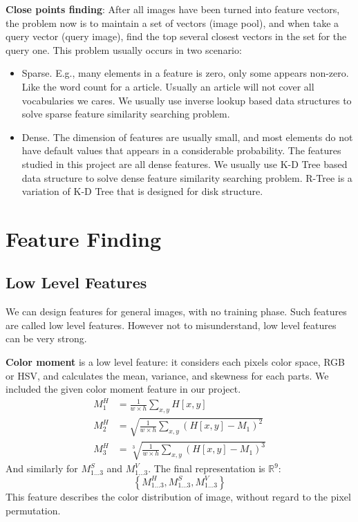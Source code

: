 \documentclass{acm_proc_article-sp}
\begin{document}
\textbf{Close points finding}: After all images have been turned into feature
vectors, the problem now is to maintain a set of vectors (image pool), and when
take a query vector (query image), find the top several closest vectors in the
set for the query one. This problem usually occurs in two scenario:
\begin{itemize}
        \item Sparse. E.g., many elements in a feature is zero, only some
                appears non-zero. Like the word count for a article. Usually an
                article will not cover all vocabularies we cares. We usually
                use inverse lookup based data structures to solve sparse
                feature similarity searching problem.
        \item Dense. The dimension of features are usually small, and most
                elements do not have default values that appears in a
                considerable probability. The features studied in this project
                are all dense features. We usually use K-D Tree based data
                structure to solve dense feature similarity searching problem.
                R-Tree is a variation of K-D Tree that is designed for disk
                structure.
\end{itemize}

\section{Feature Finding}
\subsection{Low Level Features}

We can design features for general images, with no training phase. Such
features are called low level features. However not to misunderstand, low level
features can be very strong.

\textbf{Color moment} is a low level feature: it considers each pixels color
space, RGB or HSV, and calculates the mean, variance, and skewness for each parts.
We included the given color moment feature in our project.
\begin{align}
        M^H_1&=\frac{1}{w\times h}\sum_{x,y}H[x,y]\\
        M^H_2&=\sqrt{\frac{1}{w\times h}\sum_{x,y}(H[x,y]-M_1)^2}\\
        M^H_3&=\sqrt[3]{\frac{1}{w\times h}\sum_{x,y}(H[x,y]-M_1)^3}
\end{align}
And similarly for $M^S_{1\dots 3}$ and $M^V_{1\dots 3}$. The final
representation is $\mathbb{R}^9$:\[\left\{M^H_{1\dots 3}, M^S_{1\dots 3},
M^V_{1\dots 3}\right\}\]
This feature describes the color distribution of image, without regard to the
pixel permutation.
\end{document}
